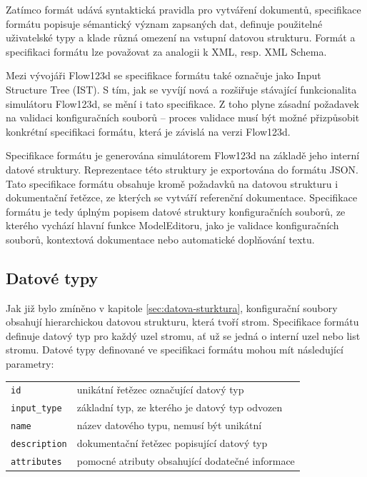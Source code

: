 \documentclass[FM,bw,DP]{tulthesis}
\begin{document}
Zatímco formát udává syntaktická pravidla pro vytváření dokumentů, specifikace formátu popisuje sémantický význam zapsaných dat, definuje použitelné uživatelské typy a klade různá omezení na vstupní datovou strukturu. Formát a specifikaci formátu lze považovat za analogii k XML, resp. XML Schema.

Mezi vývojáři Flow123d se specifikace formátu také označuje jako Input Structure Tree (IST). S tím, jak se vyvíjí nová a rozšiřuje stávající funkcionalita simulátoru Flow123d, se mění i tato specifikace. Z toho plyne zásadní požadavek na validaci konfiguračních souborů -- proces validace musí být možné přizpůsobit konkrétní specifikaci formátu, která je závislá na verzi Flow123d.

Specifikace formátu je generována simulátorem Flow123d na základě jeho interní datové struktury. Reprezentace této struktury je exportována do formátu JSON. Tato specifikace formátu obsahuje kromě požadavků na datovou strukturu i dokumentační řetězce, ze kterých se vytváří referenční dokumentace. Specifikace formátu je tedy úplným popisem datové struktury konfiguračních souborů, ze kterého vychází hlavní funkce ModelEditoru, jako je validace konfiguračních souborů, kontextová dokumentace nebo automatické doplňování textu.

\subsection{Datové typy}
\label{sec:analyza-specifikace-formatu-datove-typy}
Jak již bylo zmíněno v kapitole \ref{sec:datova-sturktura}, konfigurační soubory obsahují hierarchickou datovou strukturu, která tvoří strom. Specifikace formátu definuje datový typ pro každý uzel stromu, ať už se jedná o interní uzel nebo list stromu. Datové typy definované ve specifikaci formátu mohou mít následující parametry:

\vspace{0.5cm}
\begin{tabular}{m{3cm}@{}l}
\texttt{id}\dotfill & unikátní řetězec označující datový typ \\
\texttt{input\_type}\dotfill & základní typ, ze kterého je datový typ odvozen  \\
\texttt{name}\dotfill & název datového typu, nemusí být unikátní \\
\texttt{description}\dotfill & dokumentační řetězec popisující datový typ \\
\texttt{attributes}\dotfill & pomocné atributy obsahující dodatečné informace \\
\end{tabular}
\vspace{0.5cm}
\end{document}
